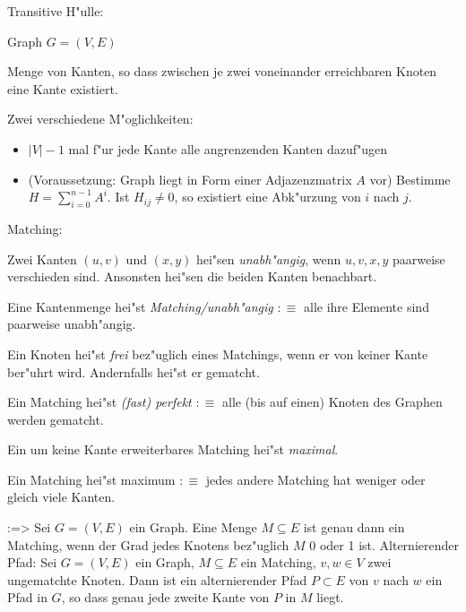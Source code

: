 \algorithm Transitive H"ulle:{
  \given Graph $G=(V,E)$
  
  \aim Menge von Kanten, so dass zwischen je zwei voneinander erreichbaren
    Knoten eine Kante existiert.
  
  Zwei verschiedene M"oglichkeiten: 
  \begin{itemize} 
    \item $|V|-1$ mal f"ur jede Kante alle angrenzenden Kanten dazuf"ugen
    \item (Voraussetzung: Graph liegt in Form einer Adjazenzmatrix $A$
    vor) Bestimme $H=\sum_{i=0}^{n-1} A^i$. Ist $H_{ij}\ne 0$, so existiert
    eine Abk"urzung von $i$ nach $j$.
  \end{itemize}
}
 Matching:{
  Zwei Kanten $(u,v)$ und $(x,y)$ hei"sen \textit{unabh"angig}, wenn $u,v,x,y$ 
  paarweise verschieden sind. Ansonsten hei"sen die beiden Kanten benachbart.
  
  Eine Kantenmenge hei"st \textit{Matching/unabh"angig} $:\equiv$ 
  alle ihre Elemente sind paarweise unabh"angig.
  
  Ein Knoten hei"st \textit{frei} bez"uglich eines Matchings, wenn er von 
  keiner Kante ber"uhrt wird. Andernfalls hei"st er gematcht.
  
  Ein Matching hei"st \textit{(fast) perfekt} $:\equiv$ alle (bis auf einen) 
  Knoten des Graphen werden gematcht.
  
  Ein um keine Kante erweiterbares Matching hei"st \textit{maximal}.
  
  Ein Matching hei"st maximum $:\equiv$ jedes andere Matching hat weniger
  oder gleich viele Kanten.
}
\theorem:=>{
  Sei $G=(V,E)$ ein Graph. Eine Menge $M\subseteq E$ ist genau dann ein 
  Matching, wenn der Grad jedes Knotens bez"uglich $M$ 0 oder 1 ist.
}
 Alternierender Pfad:{
  Sei $G=(V,E)$ ein Graph, $M\subseteq E$ ein Matching, $v,w\in V$ zwei 
  ungematchte Knoten. Dann ist ein alternierender Pfad $P\subset E$ von 
  $v$ nach $w$ ein Pfad in $G$, so dass genau jede zweite Kante 
  von $P$ in $M$ liegt.
}
